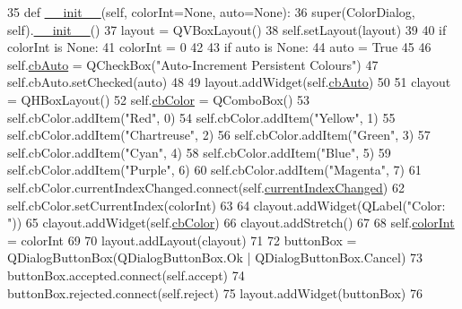 \begin{DoxyCode}
35     \textcolor{keyword}{def }\hyperlink{classsoftware_1_1chipwhisperer_1_1common_1_1ui_1_1GraphWidget_1_1ColorDialog_ab72ef5ec3f8bf14fae06b3c95e2ff1b8}{\_\_init\_\_}(self, colorInt=None, auto=None):
36         super(ColorDialog, self).\hyperlink{classsoftware_1_1chipwhisperer_1_1common_1_1ui_1_1GraphWidget_1_1ColorDialog_ab72ef5ec3f8bf14fae06b3c95e2ff1b8}{\_\_init\_\_}()
37         layout = QVBoxLayout()
38         self.setLayout(layout)
39                 
40         \textcolor{keywordflow}{if} colorInt \textcolor{keywordflow}{is} \textcolor{keywordtype}{None}:
41             colorInt = 0
42 
43         \textcolor{keywordflow}{if} auto \textcolor{keywordflow}{is} \textcolor{keywordtype}{None}:
44             auto = \textcolor{keyword}{True}
45 
46         self.\hyperlink{classsoftware_1_1chipwhisperer_1_1common_1_1ui_1_1GraphWidget_1_1ColorDialog_a3434fbb313b6184880eda429dc5137e2}{cbAuto} = QCheckBox(\textcolor{stringliteral}{"Auto-Increment Persistent Colours"})
47         self.cbAuto.setChecked(auto)
48         
49         layout.addWidget(self.\hyperlink{classsoftware_1_1chipwhisperer_1_1common_1_1ui_1_1GraphWidget_1_1ColorDialog_a3434fbb313b6184880eda429dc5137e2}{cbAuto})
50         
51         clayout = QHBoxLayout()
52         self.\hyperlink{classsoftware_1_1chipwhisperer_1_1common_1_1ui_1_1GraphWidget_1_1ColorDialog_a98e4aea598edf40302ef87c432a02b16}{cbColor} = QComboBox()
53         self.cbColor.addItem(\textcolor{stringliteral}{"Red"},  0)
54         self.cbColor.addItem(\textcolor{stringliteral}{"Yellow"},  1)
55         self.cbColor.addItem(\textcolor{stringliteral}{"Chartreuse"},  2)
56         self.cbColor.addItem(\textcolor{stringliteral}{"Green"},  3)
57         self.cbColor.addItem(\textcolor{stringliteral}{"Cyan"},  4)
58         self.cbColor.addItem(\textcolor{stringliteral}{"Blue"},  5)
59         self.cbColor.addItem(\textcolor{stringliteral}{"Purple"},  6)
60         self.cbColor.addItem(\textcolor{stringliteral}{"Magenta"},  7)          
61         self.cbColor.currentIndexChanged.connect(self.\hyperlink{classsoftware_1_1chipwhisperer_1_1common_1_1ui_1_1GraphWidget_1_1ColorDialog_a84e27fa5eb2bc5a0282a29f7274b97ba}{currentIndexChanged})
62         self.cbColor.setCurrentIndex(colorInt)
63         
64         clayout.addWidget(QLabel(\textcolor{stringliteral}{"Color: "}))
65         clayout.addWidget(self.\hyperlink{classsoftware_1_1chipwhisperer_1_1common_1_1ui_1_1GraphWidget_1_1ColorDialog_a98e4aea598edf40302ef87c432a02b16}{cbColor})
66         clayout.addStretch()
67 
68         self.\hyperlink{classsoftware_1_1chipwhisperer_1_1common_1_1ui_1_1GraphWidget_1_1ColorDialog_acaecfb6a19402664b7020f129377b3e8}{colorInt} = colorInt
69         
70         layout.addLayout(clayout)
71         
72         buttonBox = QDialogButtonBox(QDialogButtonBox.Ok | QDialogButtonBox.Cancel)
73         buttonBox.accepted.connect(self.accept)
74         buttonBox.rejected.connect(self.reject)
75         layout.addWidget(buttonBox)
76         
\end{DoxyCode}


